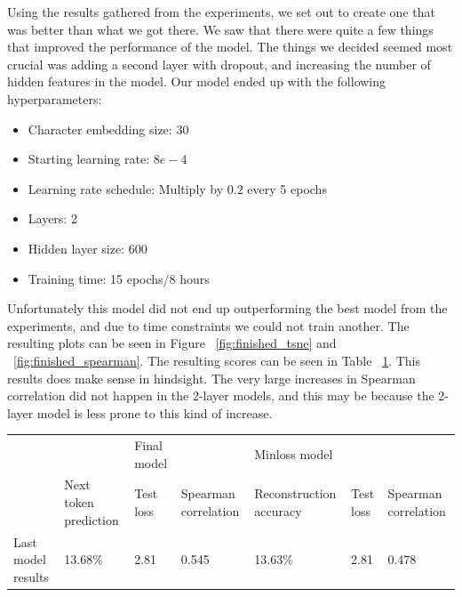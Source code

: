 Using the results gathered from the experiments, we set out to create one that was better than what we got there. We saw that there were quite a few things that improved the performance of the model. The things we decided seemed most crucial was adding a second layer with dropout, and increasing the number of hidden features in the model. Our model ended up with the following hyperparameters:
\begin{itemize}
    \item Character embedding size: 30
    \item Starting learning rate: $8e-4$
    \item Learning rate schedule: Multiply by $0.2$ every 5 epochs
    \item Layers: 2
    \item Hidden layer size: $600$
    \item Training time: 15 epochs/8 hours
\end{itemize}

Unfortunately this model did not end up outperforming the best model from the experiments, and due to time constraints we could not train another. The resulting plots can be seen in Figure ~\ref{fig:finished_tsne} and ~\ref{fig:finished_spearman}. The resulting scores can be seen in Table ~\ref{tab:finished_results}. This results does make sense in hindsight. The very large increases in Spearman correlation did not happen in the 2-layer models, and this may be because the 2-layer model is less prone to this kind of increase.

\begin{table}[]
\begin{tabular}{|l|lll|lll|}
\hline
                   &                                            & Final model                    &                      & Minloss model                                &                                &                      \\ \cline{2-7}
                   & \multicolumn{1}{l|}{Next token prediction} & \multicolumn{1}{l|}{Test loss} & Spearman correlation & \multicolumn{1}{l|}{Reconstruction accuracy} & \multicolumn{1}{l|}{Test loss} & Spearman correlation \\ \hline
Last model results & \multicolumn{1}{l|}{13.68\%}               & \multicolumn{1}{l|}{2.81}      & 0.545                & \multicolumn{1}{l|}{13.63\%}                 & \multicolumn{1}{l|}{2.81}      & 0.478                \\ \hline
\end{tabular}
\label{tab:finished_results}
\end{table}


